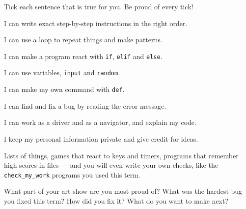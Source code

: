 \begin{exercise}
Tick each sentence that is true for you. Be proud of every tick!
\begin{checklist}
  \item I can write exact step-by-step instructions in the right order.
  \item I can use a loop to repeat things and make patterns.
  \item I can make a program react with \texttt{if}, \texttt{elif} and \texttt{else}.
  \item I can use variables, \texttt{input} and \texttt{random}.
  \item I can make my own command with \texttt{def}.
  \item I can find and fix a bug by reading the error message.
  \item I can work as a driver and as a navigator, and explain my code.
  \item I keep my personal information private and give credit for ideas.
\end{checklist}
\end{exercise}

\begin{tip}
Lists of things, games that react to keys and timers, programs that remember high scores in files --- and you will even write your own checks, like the \texttt{check\_my\_work} programs you used this term.
\end{tip}

\begin{vocab}
\end{vocab}

\begin{reflection}
What part of your art show are you most proud of?
What was the hardest bug you fixed this term? How did you fix it?
What do you want to make next?
\end{reflection}
